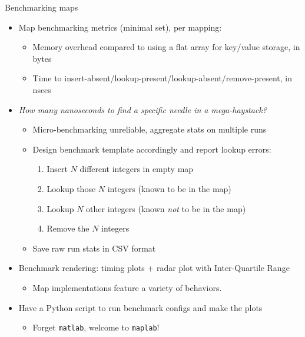 \begin{frame}[fragile]{Benchmarking maps}

  \begin{itemize}
  \item Map benchmarking metrics (minimal set), per mapping:
    \begin{itemize}
    \item Memory overhead compared to using a flat array for key/value storage, in bytes
    \item Time to insert-absent/lookup-present/lookup-absent/remove-present, in nsecs
    \end{itemize}
  \item {\em How many nanoseconds to find a specific needle in a mega-haystack?}
    \begin{itemize}
    \item Micro-benchmarking unreliable, aggregate stats on multiple runs
    \item Design benchmark template accordingly and report lookup errors:
      \begin{enumerate}
      \item Insert $N$ different integers in empty map
      \item Lookup those $N$ integers (known to be in the map)
      \item Lookup $N$ other integers (known {\em not} to be in the map)
      \item Remove the $N$ integers
      \end{enumerate}
    \item Save raw run stats in CSV format
    \end{itemize}
  \item Benchmark rendering: timing plots + radar plot with Inter-Quartile Range
    \begin{itemize}
    \item Map implementations feature a variety of behaviors.
    \end{itemize}
  \item Have a Python script to run benchmark configs and make the plots
    \begin{itemize}
    \item Forget \lstinline{matlab}, welcome to  \lstinline{maplab}!
    \end{itemize}
  \end{itemize}

\end{frame}


